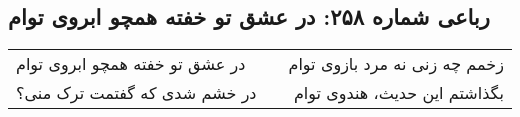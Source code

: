 \begin{center}
\section*{رباعی شماره ۲۵۸: در عشق تو خفته همچو ابروی توام}
\label{sec:sh258}
\begin{longtable}{l p{0.5cm} r}
در عشق تو خفته همچو ابروی توام
&&
زخمم چه زنی نه مرد بازوی توام
\\
در خشم شدی که گفتمت ترک منی؟
&&
بگذاشتم این حدیث، هندوی توام
\\
\end{longtable}
\end{center}
